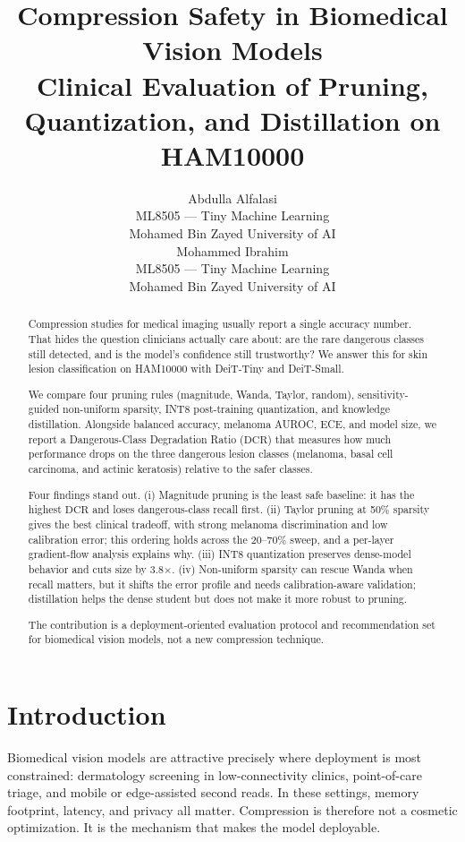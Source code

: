 \documentclass{article}
\title{Compression Safety in Biomedical Vision Models\\
Clinical Evaluation of Pruning, Quantization, and Distillation on HAM10000}
\author{%
  Abdulla Alfalasi \\
  ML8505 --- Tiny Machine Learning \\
  Mohamed Bin Zayed University of AI \\
  \And
  Mohammed Ibrahim \\
  ML8505 --- Tiny Machine Learning \\
  Mohamed Bin Zayed University of AI \\
}
\date{}
\newcommand{\DCR}{\ensuremath{\mathrm{DCR}}}
\begin{document}
\maketitle

\begin{abstract}
Compression studies for medical imaging usually report a single accuracy number. That hides the question clinicians actually care about: are the rare dangerous classes still detected, and is the model's confidence still trustworthy? We answer this for skin lesion classification on HAM10000 with DeiT-Tiny and DeiT-Small.

We compare four pruning rules (magnitude, Wanda, Taylor, random), sensitivity-guided non-uniform sparsity, INT8 post-training quantization, and knowledge distillation. Alongside balanced accuracy, melanoma AUROC, ECE, and model size, we report a Dangerous-Class Degradation Ratio (\DCR{}) that measures how much performance drops on the three dangerous lesion classes (melanoma, basal cell carcinoma, and actinic keratosis) relative to the safer classes.

Four findings stand out. (i) Magnitude pruning is the least safe baseline: it has the highest \DCR{} and loses dangerous-class recall first. (ii) Taylor pruning at 50\% sparsity gives the best clinical tradeoff, with strong melanoma discrimination and low calibration error; this ordering holds across the 20--70\% sweep, and a per-layer gradient-flow analysis explains why. (iii) INT8 quantization preserves dense-model behavior and cuts size by 3.8$\times$. (iv) Non-uniform sparsity can rescue Wanda when recall matters, but it shifts the error profile and needs calibration-aware validation; distillation helps the dense student but does not make it more robust to pruning.

The contribution is a deployment-oriented evaluation protocol and recommendation set for biomedical vision models, not a new compression technique.
\end{abstract}

\section{Introduction}
Biomedical vision models are attractive precisely where deployment is most constrained: dermatology screening in low-connectivity clinics, point-of-care triage, and mobile or edge-assisted second reads. In these settings, memory footprint, latency, and privacy all matter. Compression is therefore not a cosmetic optimization. It is the mechanism that makes the model deployable.
\end{document}
